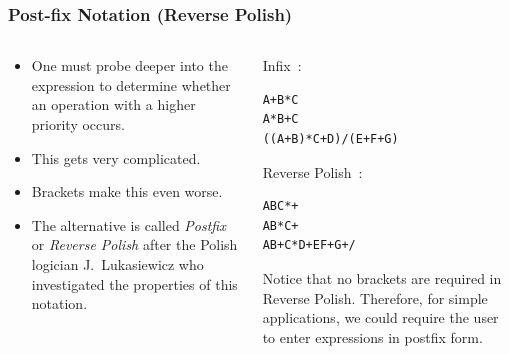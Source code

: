 
\begin{frame}[fragile]
\frametitle{Post-fix Notation (Reverse Polish)}
\begin{columns}[T]

\begin{column}{0.45\textwidth}
\begin{itemize}[<+->]
\item One must probe deeper into the expression to determine whether an operation with a higher priority occurs.
\item This gets very complicated.
\item Brackets make this even worse.
\item The alternative is called {\it Postfix} or {\it Reverse Polish}
after the Polish logician J.\ Lukasiewicz who investigated the
properties of this notation.
\end{itemize}
\end{column}

\begin{column}{0.45\textwidth}
\pause
Infix~:
\begin{verbatim}
A+B*C
A*B+C
((A+B)*C+D)/(E+F+G)
\end{verbatim}

Reverse Polish~:
\begin{verbatim}
ABC*+
AB*C+
AB+C*D+EF+G+/
\end{verbatim}

\pause
Notice that no brackets are required in Reverse Polish. Therefore, for
simple applications, we could require the user to enter expressions in
postfix form.
\end{column}

\end{columns}
\end{frame}


